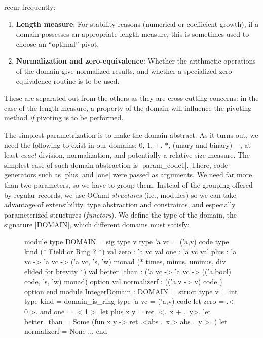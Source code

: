 \documentclass[draft]{elsart}
\begin{document}
recur frequently:
\vspace*{-6pt}
\begin{enumerate}
    \item \textbf{Length measure}:  For stability reasons
        (numerical or coefficient growth), if a domain
      possesses
        an appropriate length measure, this is sometimes used to choose
        an ``optimal'' pivot.
    \item \textbf{Normalization and zero-equivalence}: Whether the
      arithmetic operations of the domain give normalized results, and
      whether a specialized zero-equivalence routine is to be used.
\end{enumerate}
\noindent These are separated out from the others as they are cross-cutting
concerns: in the case of the length measure, a property of the domain
will influence the pivoting method \emph{if} pivoting is to be
performed.

The simplest parametrization is to make the domain abstract. As it
turns out, we need the following to exist in our domains: $0$, $1$,
$+$, $*$, (unary and binary) $-$, at least \emph{exact} division,
normalization, and potentially a relative size measure. The simplest
case of such domain abstraction is |param_code1|.
There, code-generators such as |plus| and |one|
were passed as arguments. We need far more than
two parameters, so we have to group them. Instead of the grouping
offered by regular records, we use OCaml \emph{structures} (i.e.,
modules)
so we can take advantage of extensibility, type abstraction and constraints,
and especially parameterized structures (\emph{functors}).
We define the type of the domain, the signature |DOMAIN|, which
different domains must satisfy:
\begin{figure}[h]
\begin{code}
module type DOMAIN = sig
  type v    type 'a vc = ('a,v) code
  type kind (* Field or Ring ? *)
  val zero : 'a vc   val one : 'a vc
  val plus : 'a vc -> 'a vc -> ('a vc, 's, 'w) monad
  (* times, minus, uminus, div elided for brevity *)
  val better_than : ('a vc -> 'a vc -> 
      (('a,bool) code, 's, 'w) monad) option
  val normalizerf : (('a,v -> v) code ) option
end 
module IntegerDomain : DOMAIN = struct
  type v = int  type kind = domain_is_ring
  type 'a vc = ('a,v) code
  let zero = .< 0 >.  and one = .< 1 >. 
  let plus x y = ret .<.~x + .~y>. 
  let better_than = Some (fun x y -> ret .<abs .~x > abs .~y >. )
  let normalizerf = None
  ...
end
\end{code}
\end{figure}
\end{document}
